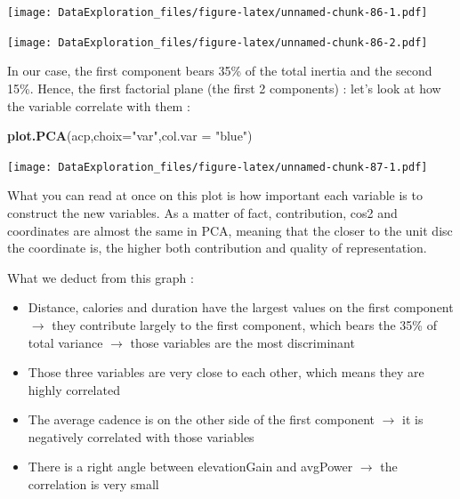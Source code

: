 \documentclass[
]{book}
\newenvironment{Shaded}{\begin{snugshade}}{\end{snugshade}}
\newcommand{\DataTypeTok}[1]{\textcolor[rgb]{0.13,0.29,0.53}{#1}}
\newcommand{\DecValTok}[1]{\textcolor[rgb]{0.00,0.00,0.81}{#1}}
\newcommand{\KeywordTok}[1]{\textcolor[rgb]{0.13,0.29,0.53}{\textbf{#1}}}
\newcommand{\NormalTok}[1]{#1}
\newcommand{\OperatorTok}[1]{\textcolor[rgb]{0.81,0.36,0.00}{\textbf{#1}}}
\newcommand{\StringTok}[1]{\textcolor[rgb]{0.31,0.60,0.02}{#1}}
\providecommand{\tightlist}{%
  \setlength{\itemsep}{0pt}\setlength{\parskip}{0pt}}
\begin{document}
\begin{Shaded}
\end{Shaded}

\texttt{[image: DataExploration\_files/figure-latex/unnamed-chunk-86-1.pdf]}

\begin{Shaded}
\end{Shaded}

\texttt{[image: DataExploration\_files/figure-latex/unnamed-chunk-86-2.pdf]}

In our case, the first component bears 35\% of the total inertia and the second 15\%. Hence, the first factorial plane (the first 2 components) : let's look at how the variable correlate with them :

\begin{Shaded}
\begin{Highlighting}[]
\KeywordTok{plot.PCA}\NormalTok{(acp,}\DataTypeTok{choix=}\StringTok{"var"}\NormalTok{,}\DataTypeTok{col.var =} \StringTok{"blue"}\NormalTok{)}
\end{Highlighting}
\end{Shaded}

\texttt{[image: DataExploration\_files/figure-latex/unnamed-chunk-87-1.pdf]}

What you can read at once on this plot is how important each variable is to construct the new variables. As a matter of fact, contribution, cos2 and coordinates are almost the same in PCA, meaning that the closer to the unit disc the coordinate is, the higher both contribution and quality of representation.

What we deduct from this graph :

\begin{itemize}
\tightlist
\item
  Distance, calories and duration have the largest values on the first component \(\rightarrow\) they contribute largely to the first component, which bears the 35\% of total variance \(\rightarrow\) those variables are the most discriminant
\item
  Those three variables are very close to each other, which means they are highly correlated
\item
  The average cadence is on the other side of the first component \(\rightarrow\) it is negatively correlated with those variables
\item
  There is a right angle between elevationGain and avgPower \(\rightarrow\) the correlation is very small
\end{itemize}
\end{document}
